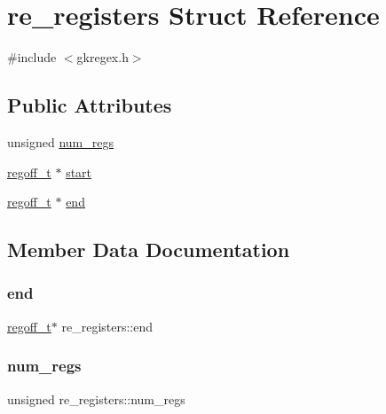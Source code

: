 \hypertarget{a00690}{}\section{re\+\_\+registers Struct Reference}
\label{a00690}


{\ttfamily \#include $<$gkregex.\+h$>$}

\subsection*{Public Attributes}
\begin{DoxyCompactItemize}
\item 
unsigned \hyperlink{a00690_aeae8140aadf339f6fe0c49277d6aa7b5}{num\+\_\+regs}
\item 
\hyperlink{a00092_a5b34995b47432512ee4ffa32b836e65f}{regoff\+\_\+t} $\ast$ \hyperlink{a00690_a6676ddb6ab07e50191e149b04dbcfe03}{start}
\item 
\hyperlink{a00092_a5b34995b47432512ee4ffa32b836e65f}{regoff\+\_\+t} $\ast$ \hyperlink{a00690_a0a9d373f1ab74c9c2063f233476fa5d4}{end}
\end{DoxyCompactItemize}


\subsection{Member Data Documentation}
\mbox{\label{a00690_a0a9d373f1ab74c9c2063f233476fa5d4}} 
\subsubsection{\texorpdfstring{end}{end}}
{\footnotesize\ttfamily \hyperlink{a00092_a5b34995b47432512ee4ffa32b836e65f}{regoff\+\_\+t}$\ast$ re\+\_\+registers\+::end}

\mbox{\label{a00690_aeae8140aadf339f6fe0c49277d6aa7b5}} 
\subsubsection{\texorpdfstring{num\+\_\+regs}{num\_regs}}
{\footnotesize\ttfamily unsigned re\+\_\+registers\+::num\+\_\+regs}

